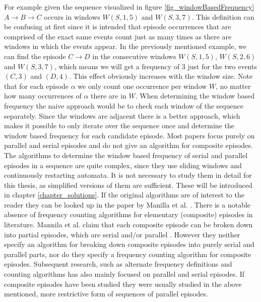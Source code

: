 For example given the sequence visualized in figure \ref{fig_windowBasedFrequency} $A \rightarrow B \rightarrow C$ occurs in windows $W(S,1,5)$ and $W(S,3,7)$. \newline 
This definition can be confusing at first since it is intended that episode occurrences that are comprised of the exact same events count just as many times as there are windows in which the events appear. In the previously mentioned example, we can find the episode $C \rightarrow D$ in the consecutive windows $W(S,1,5)$, $W(S,2,6)$ and $W(S,3,7)$, which means we will get a frequency of $3$ just for the two events $(C,3)$ and $(D,4)$. This effect obviously increases with the window size. Note that for each episode $\alpha$ we only count one occurrence per window $W$, no matter how many occurrences of $\alpha$ there are in $W$.\newline
When determining the window based frequency the naive approach would be to check each window of the sequence separately. Since the windows are adjacent there is a better approach, which makes it possible to only iterate over the sequence once and determine the window based frequency for each candidate episode. Most papers focus purely on parallel and serial episodes and do not give an algorithm for composite episodes. The algorithms to determine the window based frequency of serial and parallel episodes in a sequence are quite complex, since they use sliding windows and continuously restarting automata. It is not necessary to study them in detail for this thesis, as simplified versions of them are sufficient. These will be introduced in chapter \ref{chapter_solutions}. If the original algorithms are of interest to the reader they can be looked up in the paper by Manilla et al. \cite{mannila1997discovery}.
There is a notable absence of frequency counting algorithms for elementary (composite) episodes in literature. Mannila et al. claim that each composite episode can be broken down into partial episodes, which are serial and/or parallel \cite{mannila1997discovery}. However they neither specify an algorithm for breaking down composite episodes into purely serial and parallel parts, nor do they specify a frequency counting algorithm for composite episodes. Subsequent research, such as alternate frequency definitions and counting algorithms has also mainly focused on parallel and serial episodes. If composite episodes have been studied they were usually studied in the above mentioned, more restrictive form of sequences of parallel episodes. \newline

